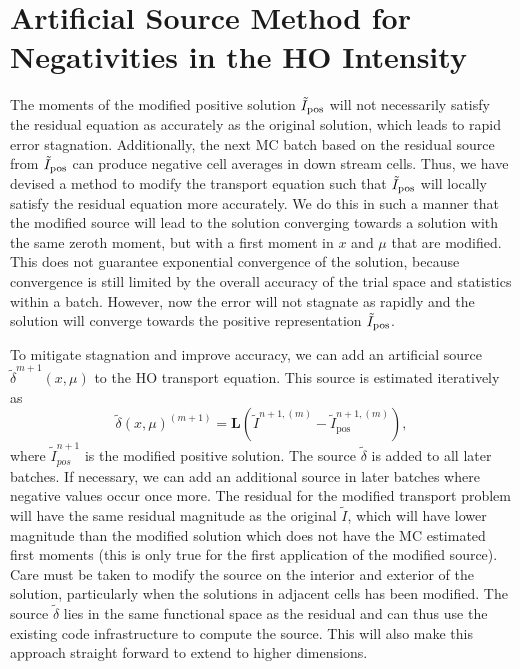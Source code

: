 \section{Artificial Source Method for Negativities in the HO Intensity}

The moments of the modified positive solution $\tilde I_{{\text{pos}}}$ will
not necessarily satisfy the residual equation as accurately as the original solution, which leads to
rapid error stagnation.  Additionally, the next MC batch based on the residual source from
$\tilde I_{{\text{pos}}}$ can produce negative cell averages in down stream cells.
Thus, we have devised
a method to modify the transport equation such that $\tilde I_{{\text{pos}}}$ will locally satisfy the
residual equation more accurately.  We do this in such a manner that the
modified source will lead to the solution converging towards a solution with the same
zeroth moment, but with a first moment in $x$ and $\mu$ that are modified.  This does not
guarantee exponential convergence of the solution, because convergence is still limited by
the overall accuracy of the trial space and statistics within a batch.  However, now the error will not stagnate as rapidly
and the solution will converge towards the positive representation $\tilde I_{{\text{pos}}}$.

To mitigate stagnation and improve accuracy, we can add an artificial source
$\tilde\delta^{m+1}(x,\mu)$ to the HO transport equation.
This source is estimated iteratively as
\begin{equation*}
    \tilde\delta(x,\mu)^{(m+1)} = \mathbf{L}(\tilde{I}^{n+1,(m)} -
    \tilde{I}^{n+1,(m)}_{\text{pos}}),
\end{equation*}
where $\tilde{I}_{pos}^{n+1}$ is the modified positive solution. The source $\tilde
\delta$ is added to all later batches.  If necessary, we can add an additional source in
later batches where negative values occur once more. The residual for the modified
transport problem will have the same residual magnitude as the original $\tilde I$, which
will have lower magnitude than the modified solution which does not have the MC estimated
first moments (this is only true for the first application of the modified source).  Care
must be taken to modify the source on the interior and exterior of the solution,
particularly when the solutions in adjacent cells has been modified.  The source
$\tilde\delta$ lies in the same functional space as the residual and can thus use the
existing code infrastructure to compute the source.  This will also make this approach
straight forward to extend to higher dimensions.  

